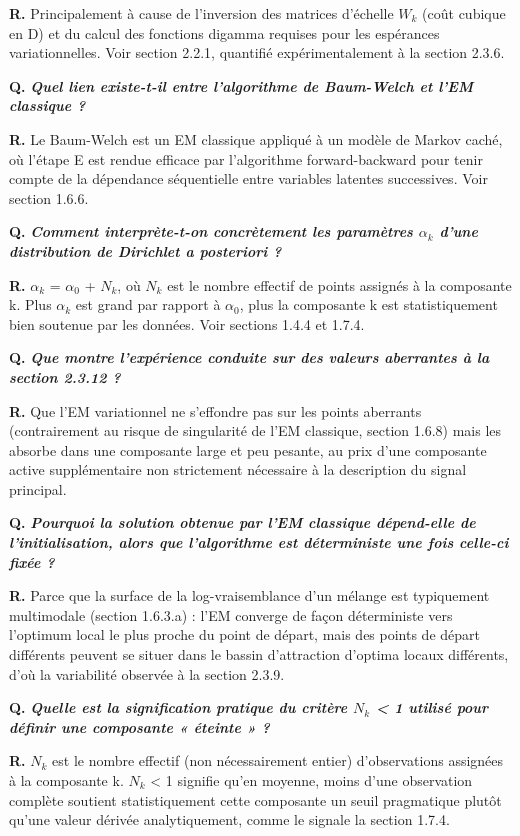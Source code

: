 \textbf{R. }Principalement à cause de l'inversion des matrices d'échelle $W_{k}$ (coût cubique en D) et du calcul des fonctions digamma requises pour les espérances variationnelles. Voir section 2.2.1, quantifié expérimentalement à la section 2.3.6.

\textbf{Q. }\textbf{\emph{Quel lien existe-t-il entre l'algorithme de Baum-Welch et l'EM classique ?}}

\textbf{R. }Le Baum-Welch est un EM classique appliqué à un modèle de Markov caché, où l'étape E est rendue efficace par l'algorithme forward-backward pour tenir compte de la dépendance séquentielle entre variables latentes successives. Voir section 1.6.6.

\textbf{Q. }\textbf{\emph{Comment interprète-t-on concrètement les paramètres $\alpha _{k}$ d'une distribution de Dirichlet a posteriori ?}}

\textbf{R. }$\alpha _{k}$ = $\alpha _{0}$ + $N_{k}$, où $N_{k}$ est le nombre effectif de points assignés à la composante k. Plus $\alpha _{k}$ est grand par rapport à $\alpha _{0}$, plus la composante k est statistiquement bien soutenue par les données. Voir sections 1.4.4 et 1.7.4.

\textbf{Q. }\textbf{\emph{Que montre l'expérience conduite sur des valeurs aberrantes à la section 2.3.12 ?}}

\textbf{R. }Que l'EM variationnel ne s'effondre pas sur les points aberrants (contrairement au risque de singularité de l'EM classique, section 1.6.8) mais les absorbe dans une composante large et peu pesante, au prix d'une composante active supplémentaire non strictement nécessaire à la description du signal principal.

\textbf{Q. }\textbf{\emph{Pourquoi la solution obtenue par l'EM classique dépend-elle de l'initialisation, alors que l'algorithme est déterministe une fois celle-ci fixée ?}}

\textbf{R. }Parce que la surface de la log-vraisemblance d'un mélange est typiquement multimodale (section 1.6.3.a) : l'EM converge de façon déterministe vers l'optimum local le plus proche du point de départ, mais des points de départ différents peuvent se situer dans le bassin d'attraction d'optima locaux différents, d'où la variabilité observée à la section 2.3.9.

\textbf{Q. }\textbf{\emph{Quelle est la signification pratique du critère $N_{k}$ < 1 utilisé pour définir une composante « éteinte » ?}}

\textbf{R. }$N_{k}$ est le nombre effectif (non nécessairement entier) d'observations assignées à la composante k. $N_{k}$ < 1 signifie qu'en moyenne, moins d'une observation complète soutient statistiquement cette composante  un seuil pragmatique plutôt qu'une valeur dérivée analytiquement, comme le signale la section 1.7.4.

